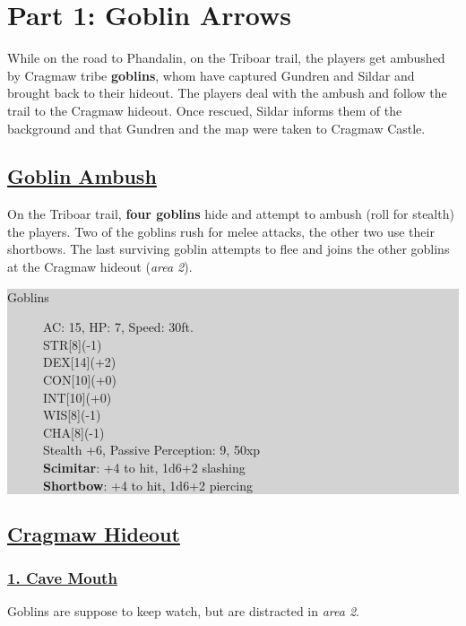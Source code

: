 	\section{Part 1: Goblin Arrows}

While on the road to Phandalin, on the Triboar trail, the players get ambushed by Cragmaw tribe \textbf{goblins}, whom have captured Gundren and Sildar and brought back to their hideout. The players deal with the ambush and follow the trail to the Cragmaw hideout. Once rescued, Sildar informs them of the background and that Gundren and the map were taken to Cragmaw Castle.



\subsection*{\underline{Goblin Ambush}}
On the Triboar trail, \textbf{four goblins} hide and attempt to ambush (roll for stealth) the players. Two of the goblins rush for melee attacks, the other two use their shortbows. The last surviving goblin attempts to flee and joins the other goblins at the Cragmaw hideout (\emph{area 2}).

\colorbox{lightgray}{\begin{minipage}{0.4\textwidth}
\begin{description}
	\item[Goblins] 
	AC: 15, HP: 7, Speed: 30ft.
	\\ STR[8](-1) 
	\\ DEX[14](+2)
	\\ CON[10](+0)
	\\ INT[10](+0)
	\\ WIS[8](-1)
	\\ CHA[8](-1) 
	\\ Stealth +6, Passive Perception: 9, 50xp
	\\ \textbf{Scimitar}: +4 to hit, 1d6+2 slashing
	\\ \textbf{Shortbow}: +4 to hit, 1d6+2 piercing
\end{description}
\end{minipage}}
\break

\subsection*{\underline{Cragmaw Hideout}}
\subsubsection*{\underline{1. Cave Mouth}}
Goblins are suppose to keep watch, but are distracted in \emph{area 2}.


